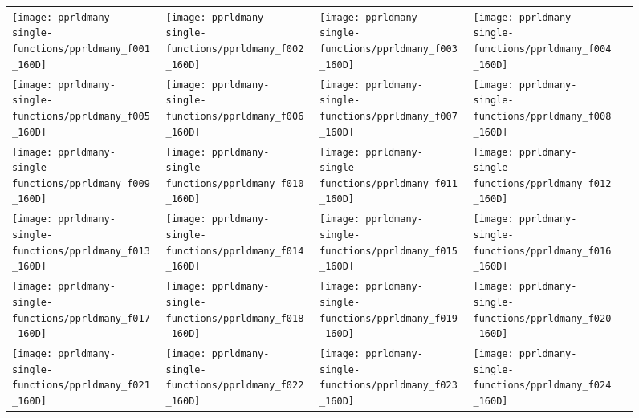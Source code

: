 \documentclass[sigconf]{acmart}
\begin{document}
{%

\begin{figure*}
\centering
\begin{tabular}{@{}l@{}l@{}l@{}l@{}l@{}}
\texttt{[image: pprldmany-single-functions/pprldmany\_f001\_160D]}&
\texttt{[image: pprldmany-single-functions/pprldmany\_f002\_160D]}&
\texttt{[image: pprldmany-single-functions/pprldmany\_f003\_160D]}&
\texttt{[image: pprldmany-single-functions/pprldmany\_f004\_160D]}\\
\texttt{[image: pprldmany-single-functions/pprldmany\_f005\_160D]}&
\texttt{[image: pprldmany-single-functions/pprldmany\_f006\_160D]}&
\texttt{[image: pprldmany-single-functions/pprldmany\_f007\_160D]}&
\texttt{[image: pprldmany-single-functions/pprldmany\_f008\_160D]}\\
\texttt{[image: pprldmany-single-functions/pprldmany\_f009\_160D]}&
\texttt{[image: pprldmany-single-functions/pprldmany\_f010\_160D]}&
\texttt{[image: pprldmany-single-functions/pprldmany\_f011\_160D]}&
\texttt{[image: pprldmany-single-functions/pprldmany\_f012\_160D]}\\
\texttt{[image: pprldmany-single-functions/pprldmany\_f013\_160D]}&
\texttt{[image: pprldmany-single-functions/pprldmany\_f014\_160D]}&
\texttt{[image: pprldmany-single-functions/pprldmany\_f015\_160D]}&
\texttt{[image: pprldmany-single-functions/pprldmany\_f016\_160D]}\\
\texttt{[image: pprldmany-single-functions/pprldmany\_f017\_160D]}&
\texttt{[image: pprldmany-single-functions/pprldmany\_f018\_160D]}&
\texttt{[image: pprldmany-single-functions/pprldmany\_f019\_160D]}&
\texttt{[image: pprldmany-single-functions/pprldmany\_f020\_160D]}\\
\texttt{[image: pprldmany-single-functions/pprldmany\_f021\_160D]}&
\texttt{[image: pprldmany-single-functions/pprldmany\_f022\_160D]}&
\texttt{[image: pprldmany-single-functions/pprldmany\_f023\_160D]}&
\texttt{[image: pprldmany-single-functions/pprldmany\_f024\_160D]}
\end{tabular}
 \caption{\label{fig:ECDFsingleOne}
}
\end{figure*}


}
\end{document}
